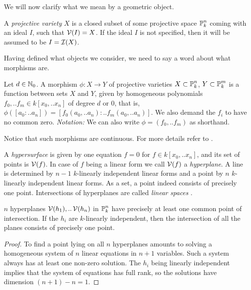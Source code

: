 We will now clarify what we mean by a geometric object.
\begin{definition}
A \emph{projective variety} $X$ is a closed subset of some projective space $\operatorname{\mathbb P}^n_k$ coming with an ideal $I$, such that $\operatorname{\mathcal V}(I) = X$.
If the ideal $I$ is not specified, then it will be assumed to be $I=\operatorname{\mathcal I}(X)$.
\end{definition}
Having defined what objects we consider, we need to say a word about what morphisms are.
\begin{definition}
Let $d \in \operatorname{\mathbb N_0}$.
A morphism $\phi : X \to Y$ of projective varieties $X \subset \operatorname{\mathbb P}^n_k$, $Y \subset \operatorname{\mathbb P}^m_k$ is a function between sets $X$ and $Y$,
given by homogeneous polynomials $f_0,..f_m \in k[x_0,..x_n]$ of degree $d$ or 0, that is, $\phi([a_0:..a_n]) = [f_0(a_0,..a_n):..f_m(a_0,..a_n)]$.
We also demand the $f_i$ to have no common zero. \emph{Notation:} We can also write $\phi = (f_0,..f_m)$ as shorthand.
\end{definition}
Notice that such morphisms are continuous.
For more details refer to \cite[part I, lecture 1]{harris1992algebraic}.

\begin{example}
A \emph{hypersurface} is given by one equation $f=0$ for $f\in k[x_0,..x_n]$, and its set of points is $\operatorname{\mathcal V}(f)$.
In case of $f$ being a linear form we call $\operatorname{\mathcal V}(f)$ a \emph{hyperplane}.
A line is determined by $n-1$ $k$-linearly independent linear forms and a point by $n$ $k$-linearly independent linear forms.
As a set, a point indeed consists of precisely one point.
Intersections of hyperplanes are called \emph{linear spaces} \cite[example 1.1]{harris1992algebraic}.
\end{example}

\begin{proposition} $n$ hyperplanes $\operatorname{\mathcal V}(h_1),..\operatorname{\mathcal V}(h_n)$ in $\operatorname{\mathbb P}^n_k$ have precisely at least one common point of intersection.
If the $h_i$ are $k$-linearly independent, then the intersection of all the planes consists of precisely one point.
\end{proposition}
\begin{proof}
To find a point lying on all $n$ hyperplanes amounts to solving a homogeneous system of $n$ linear equations in $n+1$ variables.
Such a system always has at least one non-zero solution.
The $h_i$ being linearly independent implies that the system of equations has full rank, so the solutions have dimension $(n+1) - n = 1$.
\end{proof}

